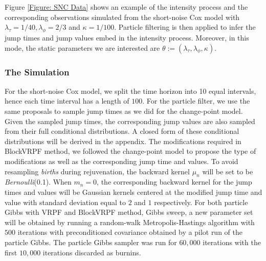 \documentclass[12pt,a4paper]{article}
\begin{document}
Figure \ref{Figure: SNC Data} shows an example of the intensity process and the corresponding observations simulated from the short-noise Cox model with \(\lambda_\tau = 1/40, \lambda_\phi=2/3\) and \(\kappa=1/100\). Particle filtering is then applied to infer the jump times and jump values embed in the intensity process. Moreover, in this mode, the static parameters we are interested are \(\theta := (\lambda_\tau,\lambda_\phi,\kappa)\). 
\subsubsection{The Simulation}
For the short-noise Cox model, we split the time horizon into 10 equal intervals, hence each time interval has a length of \(100\). For the particle filter, we use the same proposals to sample jump times as we did for the change-point model. Given the sampled jump times, the corresponding jump values are also sampled from their full conditional distributions. A closed form of these conditional distributions will be derived in the appendix. The modifications required in BlockVRPF method, we followed the change-point model to propose the type of modifications as well as the corresponding jump time and values. To avoid resampling \textit{births} during rejuvenation, the backward kernel \(\mu_n\) will be set to be \textit{Bernoulli}(0.1). When \(m_n = 0\), the corresponding backward kernel for the jump times and values will be Gaussian kernels centered at the modified jump time and value with standard deviation equal to \(2\) and \(1\) respectively. For both particle Gibbs with VRPF and BlockVRPF method, Gibbs sweep, a new parameter set will be obtained by running a random-walk Metropolis-Hastings algorithm with \(500\) iterations with preconditioned covariance obtained by a pilot run of the particle Gibbs. The particle Gibbs sampler was run for \(60,000\) iterations with the first \(10,000\) iterations discarded as burnins. 

\newpage


\end{document}

